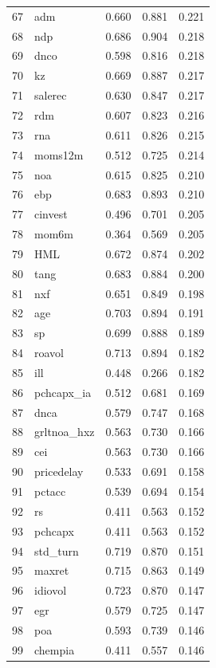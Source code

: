\begin{footnotesize}
\begin{longtable}{rl|c|c|c}
		67 & adm & 0.660 & 0.881 & 0.221 \\ 
		68 & ndp & 0.686 & 0.904 & 0.218 \\ 
		69 & dnco & 0.598 & 0.816 & 0.218 \\ 
		70 & kz & 0.669 & 0.887 & 0.217 \\ 
		71 & salerec & 0.630 & 0.847 & 0.217 \\ 
		72 & rdm & 0.607 & 0.823 & 0.216 \\ 
		73 & rna & 0.611 & 0.826 & 0.215 \\ 
		74 & moms12m & 0.512 & 0.725 & 0.214 \\ 
		75 & noa & 0.615 & 0.825 & 0.210 \\ 
		76 & ebp & 0.683 & 0.893 & 0.210 \\ 
		77 & cinvest & 0.496 & 0.701 & 0.205 \\ 
		78 & mom6m & 0.364 & 0.569 & 0.205 \\ 
		79 & HML & 0.672 & 0.874 & 0.202 \\ 
		80 & tang & 0.683 & 0.884 & 0.200 \\ 
		81 & nxf & 0.651 & 0.849 & 0.198 \\ 
		82 & age & 0.703 & 0.894 & 0.191 \\ 
		83 & sp & 0.699 & 0.888 & 0.189 \\ 
		84 & roavol & 0.713 & 0.894 & 0.182 \\ 
		85 & ill & 0.448 & 0.266 & 0.182 \\ 
		86 & pchcapx\_ia & 0.512 & 0.681 & 0.169 \\ 
		87 & dnca & 0.579 & 0.747 & 0.168 \\ 
		88 & grltnoa\_hxz & 0.563 & 0.730 & 0.166 \\ 
		89 & cei & 0.563 & 0.730 & 0.166 \\ 
		90 & pricedelay & 0.533 & 0.691 & 0.158 \\ 
		91 & pctacc & 0.539 & 0.694 & 0.154 \\ 
		92 & rs & 0.411 & 0.563 & 0.152 \\ 
		93 & pchcapx & 0.411 & 0.563 & 0.152 \\ 
		94 & std\_turn & 0.719 & 0.870 & 0.151 \\ 
		95 & maxret & 0.715 & 0.863 & 0.149 \\ 
		96 & idiovol & 0.723 & 0.870 & 0.147 \\ 
		97 & egr & 0.579 & 0.725 & 0.147 \\ 
		98 & poa & 0.593 & 0.739 & 0.146 \\ 
		99 & chempia & 0.411 & 0.557 & 0.146 \\ 

\end{longtable}
\end{footnotesize}
